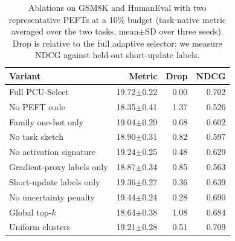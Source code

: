 \begin{table}[!b]
\centering
\small
\setlength{\tabcolsep}{4pt}
\begin{tabular}{lrrr}
\toprule
Variant & Metric & Drop & NDCG \\
\midrule
Full PCU-Select & 19.72$\pm$0.22 & 0.00 & 0.702 \\
No PEFT code & 18.35$\pm$0.41 & 1.37 & 0.526 \\
Family one-hot only & 19.04$\pm$0.29 & 0.68 & 0.602 \\
No task sketch & 18.90$\pm$0.31 & 0.82 & 0.597 \\
No activation signature & 19.24$\pm$0.25 & 0.48 & 0.629 \\
Gradient-proxy labels only & 18.87$\pm$0.34 & 0.85 & 0.563 \\
Short-update labels only & 19.36$\pm$0.27 & 0.36 & 0.639 \\
No uncertainty penalty & 19.44$\pm$0.24 & 0.28 & 0.690 \\
Global top-$k$ & 18.64$\pm$0.38 & 1.08 & 0.684 \\
Uniform clusters & 19.21$\pm$0.28 & 0.51 & 0.709 \\
\bottomrule
\end{tabular}
\caption{Ablations on GSM8K and HumanEval with two representative PEFTs at a 10\% budget (task-native metric averaged over the two tasks, mean$\pm$SD over three seeds). Drop is relative to the full adaptive selector; we measure NDCG against held-out short-update labels.}
\label{tab:ablations}
\end{table}
